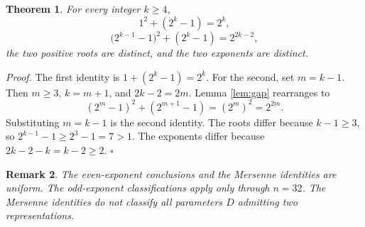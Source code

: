 \documentclass[11pt,letterpaper]{article}
\newtheorem{theorem}{Theorem}
\newtheorem{remark}[theorem]{Remark}
\newenvironment{proof}{\noindent\textit{Proof.}}{\hfill\(\square\)}
\begin{document}
\begin{theorem}
\label{thm:mersenne}
For every integer \(k\ge 4\),
\[
1^2+(2^k-1)=2^k,
\]
\[
\bigl(2^{k-1}-1\bigr)^2+(2^k-1)=2^{2k-2},
\]
the two positive roots are distinct, and the two exponents are distinct.
\end{theorem}

\begin{proof}
The first identity is \(1+(2^k-1)=2^k\). For the second, set \(m=k-1\). Then \(m\ge 3\), \(k=m+1\), and \(2k-2=2m\). Lemma \ref{lem:gap} rearranges to
\[
(2^m-1)^2+(2^{m+1}-1)=(2^m)^2=2^{2m}.
\]
Substituting \(m=k-1\) is the second identity. The roots differ because \(k-1\ge 3\), so \(2^{k-1}-1\ge 2^3-1=7>1\). The exponents differ because \(2k-2-k=k-2\ge 2\).
\end{proof}

\begin{remark}
\label{rem:not}
The even-exponent conclusions and the Mersenne identities are uniform. The odd-exponent classifications apply only through \(n=32\). The Mersenne identities do not classify all parameters \(D\) admitting two representations.
\end{remark}
\end{document}
